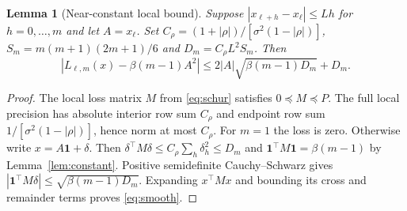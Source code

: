 \documentclass[11pt]{article}
\newtheorem{lemma}{Lemma}
\newcommand{\one}{\mathbf 1}
\newcommand{\sig}{\sigma}
\begin{document}
\begin{lemma}[Near-constant local bound]\label{lem:smooth}
Suppose $|x_{\ell+h}-x_\ell|\le Lh$ for $h=0,\ldots,m$ and let $A=x_\ell$.
Set
$C_\rho=(1+|\rho|)/[\sig^2(1-|\rho|)]$,
$S_m=m(m+1)(2m+1)/6$ and $D_m=C_\rho L^2S_m$. Then
\begin{equation}\label{eq:smooth}
 |L_{\ell,m}(x)-\beta(m-1)A^2|
 \le2|A|\sqrt{\beta(m-1)D_m}+D_m.
\end{equation}
\end{lemma}
\begin{proof}
The local loss matrix $M$ from \eqref{eq:schur} satisfies $0\preceq M\preceq P$.
The full local precision has absolute interior row sum $C_\rho$ and endpoint
row sum $1/[\sig^2(1-|\rho|)]$, hence norm at most $C_\rho$.
For $m=1$ the loss is zero. Otherwise write $x=A\one+\delta$.
Then $\delta^\top M\delta\le C_\rho\sum_h\delta_h^2\le D_m$ and
$\one^\top M\one=\beta(m-1)$ by Lemma~\ref{lem:constant}.
Positive semidefinite Cauchy--Schwarz gives
$|\one^\top M\delta|\le\sqrt{\beta(m-1)D_m}$.
Expanding $x^\top Mx$ and bounding its cross and remainder terms proves
\eqref{eq:smooth}.
\end{proof}
\end{document}

